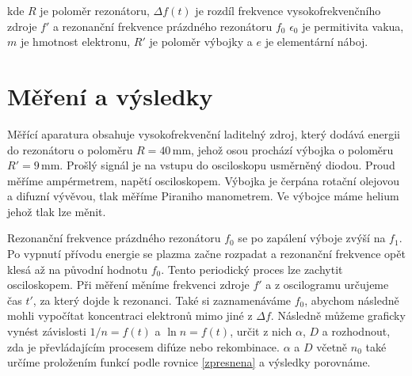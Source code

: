 \documentclass[a4paper,12pt]{article}
\begin{document}
kde $R$ je poloměr rezonátoru, $\Delta f(t)$ je rozdíl frekvence 
vysokofrekvenčního zdroje $f'$ a rezonanční frekvence prázdného rezonátoru 
$f_0$ $\epsilon_0$ je permitivita vakua, $m$ je hmotnost elektronu, $R'$ je 
poloměr výbojky a $e$ je elementární náboj.

\section{Měření a výsledky}
Měřící aparatura obsahuje vysokofrekvenční laditelný zdroj, který dodává energii do rezonátoru o poloměru $R = 40\,\si{\milli\meter}$, jehož osou prochází výbojka o poloměru $R' = 9\,\si{\milli\meter}$. Prošlý signál je na vstupu do osciloskopu usměrněný diodou. Proud měříme ampérmetrem, napětí osciloskopem. Výbojka je čerpána rotační olejovou a difuzní vývěvou, tlak měříme Piraniho manometrem. Ve výbojce máme helium jehož tlak lze měnit.

Rezonanční frekvence prázdného rezonátoru $f_0$ se po zapálení výboje zvýší na 
$f_1$. Po vypnutí přívodu energie se plazma začne rozpadat a rezonanční 
frekvence opět klesá až na původní hodnotu $f_0$. Tento periodický proces lze 
zachytit osciloskopem. Při měření měníme frekvenci zdroje $f'$ a z oscilogramu 
určujeme čas $t'$, za který dojde k rezonanci. Také si zaznamenáváme $f_0$, 
abychom následně mohli vypočítat koncentraci elektronů mimo jiné z $\Delta f$. 
Následně můžeme graficky vynést závislosti $1/n = f(t)$ a $\ln n = f(t)$, 
určit z nich $\alpha$, $D$ a rozhodnout, zda je převládajícím procesem difúze 
nebo rekombinace. $\alpha$ a $D$ včetně $n_0$ také určíme proložením funkcí 
podle rovnice \eqref{zpresnena} a výsledky porovnáme.
\end{document}
